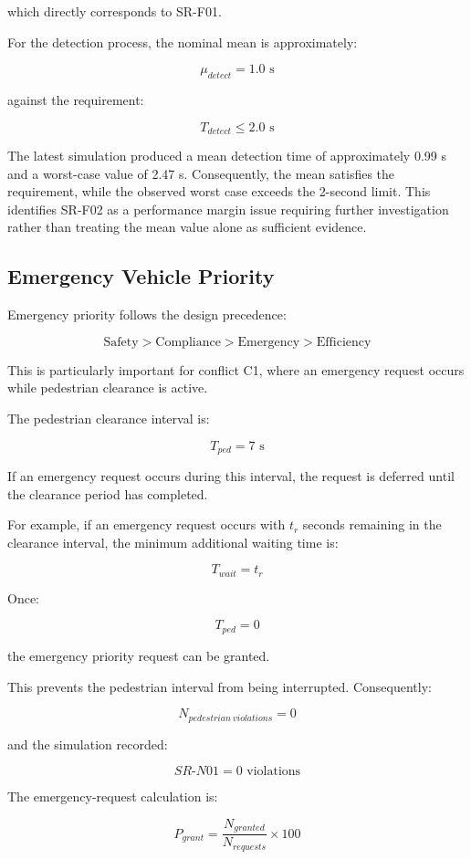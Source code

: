 \documentclass{article}
\begin{document}
which directly corresponds to SR-F01.

For the detection process, the nominal mean is approximately:

$$
\mu_{detect}=1.0\text{ s}
$$

against the requirement:

$$
T_{detect}\leq2.0\text{ s}
$$

The latest simulation produced a mean detection time of approximately 0.99 s and a worst-case value of 2.47 s. Consequently, the mean satisfies the requirement, while the observed worst case exceeds the 2-second limit. This identifies SR-F02 as a performance margin issue requiring further investigation rather than treating the mean value alone as sufficient evidence.

\subsection{Emergency Vehicle Priority}

Emergency priority follows the design precedence:

$$
\boxed{\text{Safety}>\text{Compliance}>\text{Emergency}>\text{Efficiency}}
$$

This is particularly important for conflict C1, where an emergency request occurs while pedestrian clearance is active.

The pedestrian clearance interval is:

$$
T_{ped}=7\text{ s}
$$

If an emergency request occurs during this interval, the request is deferred until the clearance period has completed.

For example, if an emergency request occurs with \(t_r\) seconds remaining in the clearance interval, the minimum additional waiting time is:

$$
T_{wait}=t_r
$$

Once:

$$
T_{ped}=0
$$

the emergency priority request can be granted.

This prevents the pedestrian interval from being interrupted. Consequently:

$$
N_{pedestrian\ violations}=0
$$

and the simulation recorded:

$$
\boxed{SR\text{-}N01=0\text{ violations}}
$$

The emergency-request calculation is:

$$
P_{grant}=
\frac{N_{granted}}{N_{requests}}\times100
$$
\end{document}
